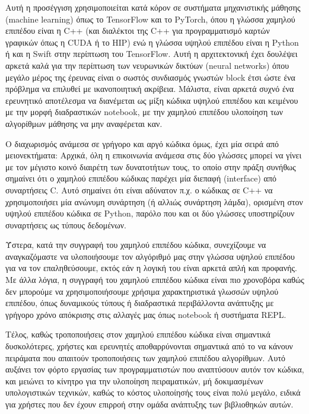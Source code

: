 Αυτή η προσέγγιση χρησιμοποιείται κατά κόρον σε συστήματα μηχανιστικής μάθησης (machine learning) όπως το TensorFlow και το PyTorch, όπου η γλώσσα χαμηλού επιπέδου είναι η C++ (και διαλέκτοι της C++ για προγραμματισμό καρτών γραφικών όπως η CUDA ή το HIP) ενώ η γλώσσα υψηλού επιπέδου είναι η Python ή και η Swift στην περίπτωση του TensorFlow.
Αυτή η αρχιτεκτονική έχει δουλέψει αρκετά καλά για την περίπτωση των νευρωνικών δικτύων (neural networks) όπου μεγάλο μέρος της έρευνας είναι ο σωστός συνδιασμός γνωστών block έτσι ώστε ένα πρόβλημα να επιλυθεί με ικανοποιητική ακρίβεια.
Μάλιστα, είναι αρκετά συχνό ένα ερευνητικό αποτέλεσμα να διανέμεται ως μίξη κώδικα υψηλού επιπέδου και κειμένου με την μορφή διαδραστικών notebook, με την χαμηλού επιπέδου υλοποίηση των αλγορίθμων μάθησης να μην αναφέρεται καν.

Ο διαχωρισμός ανάμεσα σε γρήγορο και αργό κώδικα όμως, έχει μία σειρά από μειονεκτήματα:
Αρχικά, όλη η επικοινωνία ανάμεσα στις δύο γλώσσες μπορεί να γίνει με τον μέγιστο κοινό διαιρέτη των δυνατοτήτων τους, το οποίο στην πράξη συνήθως σημαίνει ότι ο χαμηλού επιπέδου κώδικας παρέχει μία διεπαφή (interface) από συναρτήσεις C.
Αυτό σημαίνει ότι είναι αδύνατον π.χ. ο κώδικας σε C++ να χρησιμοποιήσει μία ανώνυμη συνάρτηση (ή αλλιώς συνάρτηση λάμδα), ορισμένη στον υψηλού επιπέδου κώδικα σε Python, παρόλο που και οι δύο γλώσσες υποστηρίζουν συναρτήσεις ως τύπους δεδομένων.

Ύστερα, κατά την συγγραφή του χαμηλού επιπέδου κώδικα, συνεχίζουμε να αναγκαζόμαστε να υλοποιήσουμε τον αλγόριθμό μας στην γλώσσα υψηλού επιπέδου για να τον επαληθεύσουμε, εκτός εάν η λογική του είναι αρκετά απλή και προφανής.
Με άλλα λόγια, η συγγραφή του χαμηλού επιπέδου κώδικα είναι πιο χρονοβόρα καθώς δεν μπορούμε να χρησιμοποιήσουμε χρήσιμα χαρακτηριστικά γλωσσών υψηλού επιπέδου, όπως δυναμικούς τύπους ή διαδραστικά περιβάλλοντα ανάπτυξης με γρήγορο χρόνο απόκρισης στις αλλαγές μας όπως notebook ή συστήματα REPL.

Τέλος, καθώς τροποποιήσεις στον χαμηλού επιπέδου κώδικα είναι σημαντικά δυσκολότερες, χρήστες και ερευνητές αποθαρρύνονται σημαντικά από το να κάνουν πειράματα που απαιτούν τροποποιήσεις των χαμηλού επιπέδου αλγορίθμων.
Αυτό αυξάνει τον φόρτο εργασίας των προγραμματιστών που αναπτύσουν αυτόν τον κώδικα, και μειώνει το κίνητρο για την υλοποίηση πειραματικών, μή δοκιμασμένων υπολογιστικών τεχνικών, καθώς το κόστος υλοποίησής τους είναι πολύ μεγάλο, ειδικά για χρήστες που δεν έχουν επιρροή στην ομάδα ανάπτυξης των βιβλιοθηκών αυτών.

